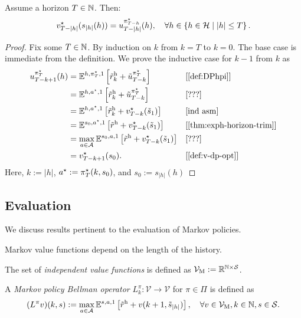 \begin{theorem}
Assume a horizon $T\in \mathbb{N}$. Then:
\[
  v^{\star}_{T-|h|}(s_{|h|}(h)) = u^{\pi^{\star}_{T-h}}_{T-|h|}(h), \quad
  \forall h\in \left\{ h\in \mathcal{H} \mid |h| \le T \right\}.
\]
\end{theorem}
\begin{proof}
Fix some $T \in \mathbb{N}$. By induction on $k$ from $k = T$ to $k=0$. The base case is immediate from the definition. We prove the inductive case for $k-1$ from $k$ as
\begin{align*}
u^{\pi\opt_T}_{T-k + 1}(h)
  &=  \E^{h, \pi\opt_T, 1} \left[ \rew_k + \tilde{u}^{\pi\opt_T}_{T-k} \right]
  && \why{\cref{def:DPhpi}} \\
  &=  \E^{h, a\opt, 1} \left[ \rew_k + \tilde{u}^{\pi\opt_T}_{T-k} \right]
  && \why{???} \\
  &=  \E^{h, a\opt, 1} \left[ \rew_{k} + v_{T-k}\opt(\tilde{s}_1) \right]
  && \why{ind asm} \\
  &=  \E^{s_0, a\opt, 1} \left[ \rew +  v_{T-k}\opt(\tilde{s}_1) \right]
  && \why{\cref{thm:exph-horizon-trim}} \\
  &=  \max_{a\in \mathcal{A}} \E^{s_0, a, 1} \left[ \rew +  v_{T-k}\opt(\tilde{s}_1) \right]
  && \why{???} \\
  &=  v_{T-k+1}\opt(s_0). && \why{\cref{def:v-dp-opt}}
\end{align*}
Here, $k := |h|$, $a^{\star} := \pi^{\star}_T(k, s_0)$, and $s_0 := s_{|h|}(h)$
\end{proof}

\subsection{Evaluation}
We discuss results pertinent to the evaluation of Markov policies. 

Markov value functions depend on the length of the history.
\begin{definition} \label{def:ValuesM}
  The set of \emph{independent value functions} is defined as $\mathcal{V}_{\mathrm{M}} := \mathbb{R}^{\mathbb{N} \times \mathcal{S}}$.
\end{definition}


\begin{definition}\label{def:DPMopt}
A \emph{Markov policy Bellman operator} $L_k^{\pi}\colon \mathcal{V} \to \mathcal{V}$ for $\pi\in \Pi$ is defined as
\[
(L^{\pi} v)(k, s)  :=
\max_{a\in \mathcal{A}} \mathbb{E}^{s, a, 1} \left[ \tilde{r}^{\mathrm{h}} + v(k + 1, \tilde{s}_{|h|}) \right], \quad \forall v\in \mathcal{V}_{\mathrm{M}}, k\in \mathbb{N}, s\in \mathcal{S}.
\]
\end{definition}

